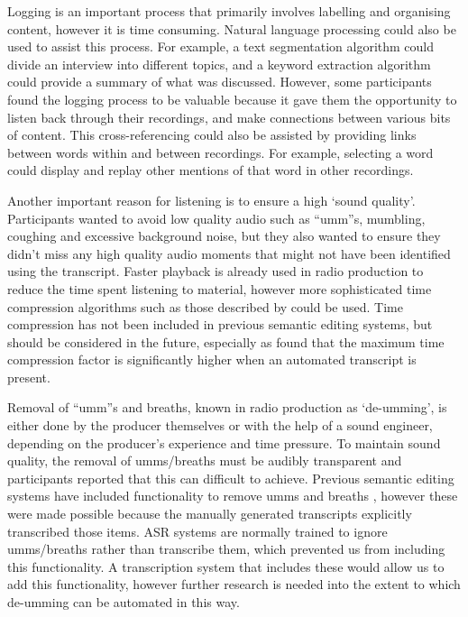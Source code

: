 Logging is an important process that primarily involves labelling and organising content, however it is time consuming.
Natural language processing could also be used to assist this process. For example, a text segmentation algorithm
\citep{Choi2000} could divide an interview into different topics, and a keyword extraction algorithm \citep{Matsuo2004}
could provide a summary of what was discussed. However, some participants found the logging process to be valuable
because it gave them the opportunity to listen back through their recordings, and make connections between various bits
of content. This cross-referencing could also be assisted by providing links between words within and between
recordings. For example, selecting a word could display and replay other mentions of that word in other recordings.

Another important reason for listening is to ensure a high `sound quality'. Participants wanted to avoid low quality
audio such as ``umm''s, mumbling, coughing and excessive background noise, but they also wanted to ensure they didn't
miss any high quality audio moments that might not have been identified using the transcript.  Faster playback is
already used in radio production to reduce the time spent listening to material, however more sophisticated time
compression algorithms such as those described by \citet{Arons1997} could be used. Time compression has not been
included in previous semantic editing systems, but should be considered in the future, especially as \citet{Vemuri2004}
found that the maximum time compression factor is significantly higher when an automated transcript is present.

Removal of ``umm''s and breaths, known in radio production as `de-umming', is either done by the producer themselves or
with the help of a sound engineer, depending on the producer's experience and time pressure. To maintain sound quality,
the removal of umms/breaths must be audibly transparent and participants reported that this can difficult to achieve.
Previous semantic editing systems have included functionality to remove umms \citep{Berthouzoz2012} and breaths
\citep{Rubin2013}, however these were made possible because the manually generated transcripts 
explicitly transcribed those items. ASR systems are normally trained to ignore umms/breaths rather than
transcribe them, which prevented us from including this functionality. A transcription system that includes these would
allow us to add this functionality, however further research is needed into the extent to which de-umming can be
automated in this way.


